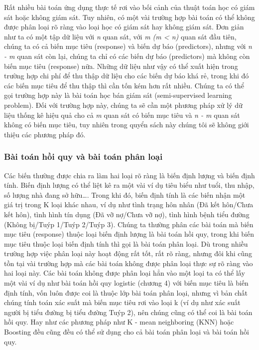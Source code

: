 \documentclass[
]{article}
\begin{document}
Rất nhiều bài toán ứng dụng thực tế rơi vào bối cảnh của thuật toán học có giám sát hoặc không giám sát. Tuy nhiên, có một vài trường hợp bài toán có thể không được phân loại rõ ràng vào loại học có giám sát hay không giám sát. Đơn giản như ta có một tập dữ liệu với \emph{n} quan sát, với \emph{m (m \textless{} n)} quan sát đầu tiên, chúng ta có cả biến mục tiêu (response) và biến dự báo (predictors), nhưng với \emph{n - m} quan sát còn lại, chúng ta chỉ có các biến dự báo (predictors) mà không còn biến mục tiêu (response) nữa. Những dữ liệu như vậy có thể xuất hiện trong trường hợp chi phí để thu thập dữ liệu cho các biến dự báo khá rẻ, trong khi đó các biến mục tiêu để thu thập thì cần tốn kém hơn rất nhiều. Chúng ta có thể gọi trường hợp này là bài toán học bán giám sát (semi-supervised learning problem). Đối với trường hợp này, chúng ta sẽ cần một phương pháp xử lý dữ liệu thống kê hiệu quả cho cả \emph{m} quan sát có biến mục tiêu và \emph{n - m} quan sát không có biến mục tiêu, tuy nhiên trong quyển sách này chúng tôi sẽ không giới thiệu các phương pháp đó.

\hypertarget{buxe0i-touxe1n-hux1ed3i-quy-vuxe0-buxe0i-touxe1n-phuxe2n-loux1ea1i}{%
\subsubsection{Bài toán hồi quy và bài toán phân loại}\label{buxe0i-touxe1n-hux1ed3i-quy-vuxe0-buxe0i-touxe1n-phuxe2n-loux1ea1i}}

Các biến thường được chia ra làm hai loại rõ ràng là biến định lượng và biến định tính. Biến định lượng có thể liệt kê ra một vài ví dụ tiêu biểu như tuổi, thu nhập, số lượng nhà đang sở hữu\ldots. Trong khi đó, biến định tính là các biến nhận một giá trị trong K loại khác nhau, ví dụ như tình trạng hôn nhân (Đã kết hôn/Chưa kết hôn), tình hình tín dụng (Đã vỡ nợ/Chưa vỡ nợ), tình hình bệnh tiểu đường (Không bị/Tuýp 1/Tuýp 2/Tuýp 3). Chúng ta thường phân các bài toán mà biến mục tiêu (response) thuộc loại biến định lượng là bài toán hồi quy, trong khi biến mục tiêu thuộc loại biến định tính thì gọi là bài toán phân loại. Dù trong nhiều trường hợp việc phân loại này hoạt động rất tốt, rất rõ ràng, nhưng đôi khi cũng tồn tại vài trường hợp mà các bài toán không được phân loại thực sự rõ ràng vào hai loại này. Các bài toán không được phân loại hẳn vào một loại ta có thể lấy một vài ví dụ như bài toán hồi quy logistic (chương 4) với biến mục tiêu là biến định tính, vốn luôn được coi là thuộc lớp bài toán phân loại, nhưng vì bản chất chúng tính toán xác suất mà biến mục tiêu rơi vào loại k (ví dụ như xác suất người bị tiểu đường bị tiểu đường Tuýp 2), nên chúng cũng có thể coi là bài toán hồi quy. Hay như các phương pháp như K - mean neighboring (KNN) hoặc Boosting đều cũng đều có thể sử dụng cho cả bài toán phân loại và bài toán hồi quy.
\end{document}

